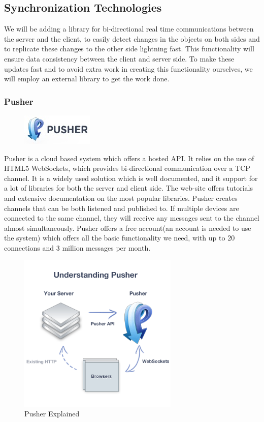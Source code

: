 \subsection{Synchronization Technologies}
We will be adding a library for bi-directional real time communications between the server and the client, to easily detect changes in the objects on both sides and to replicate these changes to the other side lightning fast. This functionality will ensure data consistency between the client and server side. To make these updates fast and to avoid extra work in creating this functionality ourselves, we will employ an external library to get the work done.

\subsubsection{Pusher}

\begin{figure}
\centering
\includegraphics[width=.19\textwidth]{image/pusher-logo.jpg}
\end{figure}

Pusher is a cloud based system which offers a hosted API. It relies on the use of HTML5 WebSockets, which provides bi-directional communication over a TCP channel. It is a widely used solution which is well documented, and it support for a lot of libraries for both the server and client side. The web-site offers tutorials and extensive documentation on the most popular libraries. Pusher creates channels that can be both listened and published to. If multiple devices are connected to the same channel, they will receive any messages sent to the channel almost simultaneously. Pusher offers a free account(an account is needed to use the system) which offers all the basic functionality we need, with up to 20 connections and 3 million messages per month.
\begin{figure}
\centering
\includegraphics[width=3in]{image/pusher-explained.png}
\caption{Pusher Explained}
\end{figure}

